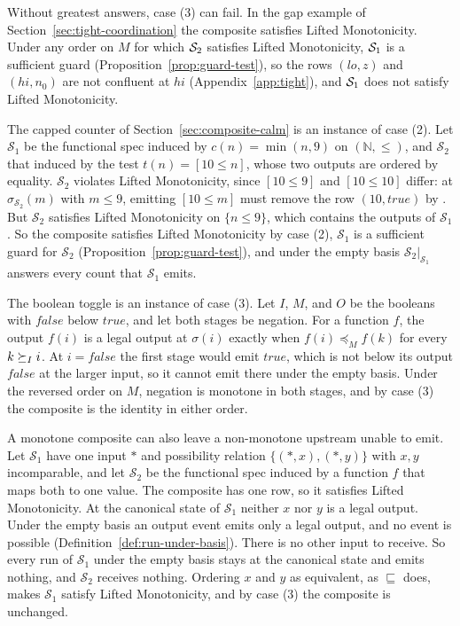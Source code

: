 Without greatest answers, case (3) can fail.  In the gap example of
Section~\ref{sec:tight-coordination} the composite satisfies Lifted
Monotonicity.  Under any order on $M$ for which $\mathcal{S}_2$ satisfies Lifted
Monotonicity, $\mathcal{S}_1$ is a sufficient guard
(Proposition~\ref{prop:guard-test}), so the rows $(\mathit{lo},z)$ and
$(\mathit{hi},n_0)$ are not confluent at $\mathit{hi}$
(Appendix~\ref{app:tight}), and $\mathcal{S}_1$ does not satisfy Lifted
Monotonicity.

The capped counter of Section~\ref{sec:composite-calm} is an instance of case
(2).  Let $\mathcal S_1$ be the functional spec induced by $c(n)=\min(n,9)$ on
$(\mathbb N,\le)$, and $\mathcal S_2$ that induced by the test $t(n)=[10\le
n]$, whose two outputs are ordered by equality.  $\mathcal S_2$ violates
Lifted Monotonicity, since $[10\le 9]$ and $[10\le 10]$ differ: at
$\sigma_{\mathcal S_2}(m)$ with $m\le 9$, emitting $[10\le m]$ must remove the
row $(10,\mathit{true})$ by \commitment.  But $\mathcal S_2$ satisfies Lifted
Monotonicity on $\{n\le 9\}$, which contains the outputs of $\mathcal S_1$.
So the composite satisfies Lifted Monotonicity by case (2), $\mathcal S_1$ is a
sufficient guard for $\mathcal S_2$ (Proposition~\ref{prop:guard-test}), and under the empty basis
$\mathcal S_2|_{\mathcal S_1}$ answers every count that $\mathcal S_1$ emits.

The boolean toggle is an instance of case (3).  Let $I$, $M$, and $O$ be the
booleans with $\mathit{false}$ below $\mathit{true}$, and let both stages be
negation.  For a function $f$, the output $f(i)$ is a legal output at
$\sigma(i)$ exactly when $f(i)\preceq_M f(k)$ for every $k\succeq_I i$.  At
$i=\mathit{false}$ the first stage would emit $\mathit{true}$, which is not
below its output $\mathit{false}$ at the larger input, so it cannot emit there
under the empty basis.  Under the
reversed order on $M$, negation is monotone in both stages, and by case (3)
the composite is the identity in either order.

A monotone composite can also leave a non-monotone upstream unable to emit.
Let $\mathcal S_1$ have one input $*$ and possibility relation
$\{(*,x),(*,y)\}$ with $x,y$ incomparable, and let $\mathcal S_2$ be the
functional spec induced by a function $f$ that maps both to one value.  The
composite has one row, so it satisfies Lifted Monotonicity.  At the canonical
state of $\mathcal S_1$ neither $x$ nor $y$ is a legal output.  Under the
empty basis an output event emits only a legal output, and no \commitment
event is possible (Definition~\ref{def:run-under-basis}).  There is no other
input to receive.  So every run of $\mathcal S_1$ under the empty basis stays at the canonical
state and emits nothing, and $\mathcal S_2$ receives nothing.  Ordering $x$
and $y$ as equivalent, as $\sqsubseteq$ does, makes $\mathcal S_1$ satisfy
Lifted Monotonicity, and by case (3) the composite is unchanged.

